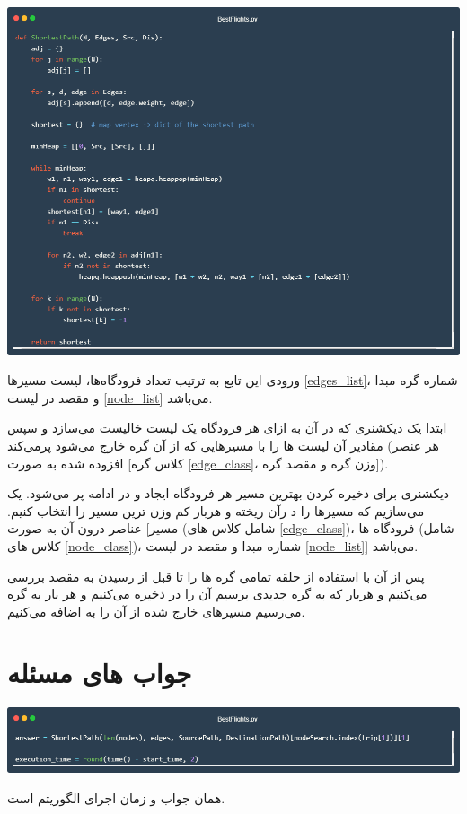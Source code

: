 \documentclass[12pt, dvipsnames, svgnames, x11names,]{article}
\begin{document}
		{\includegraphics[width=14cm]{images/code09}} \par
		{\normalsize 
		ورودی این تابع به ترتیب تعداد فرودگاه‌ها، لیست مسیرها \ref{edges_list}، شماره گره مبدا و مقصد در لیست \ref{node_list} می‌باشد.
		
		ابتدا یک دیکشنری که در آن به ازای هر فرودگاه یک لیست خالیست می‌سازد و سپس مقادیر آن لیست ها را با مسیرهایی که از آن گره خارج می‌شود پرمی‌کند (هر عنصر افزوده شده به صورت  [کلاس گره \ref{edge_class}، وزن گره و مقصد گره]).
		
		دیکشنری  برای ذخیره کردن بهترین مسیر هر فرودگاه ایجاد و در ادامه پر می‌شود.
		یک  می‌سازیم که مسیرها را د رآن ریخته و هربار کم وزن ترین مسیر را انتخاب کنیم. عناصر درون آن به صورت [مسیر (شامل کلاس های \ref{edge_class})، فرودگاه ها (شامل کلاس های \ref{node_class})، شماره مبدا و مقصد در لیست \ref{node_list}] می‌باشد.
		
		پس از آن با استفاده از حلقه  تمامی گره ها را تا قبل از رسیدن به مقصد بررسی می‌کنیم و هربار که به گره جدیدی برسیم آن را در  ذخیره می‌کنیم و هر بار به گره می‌رسیم مسیرهای خارج شده از آن را به  اضافه می‌کنیم.
		}



	\section{جواب های مسئله} \label{answer_ready}

		{\includegraphics[width=14cm]{images/code11}} \par
		{\normalsize 
		 همان جواب و  زمان اجرای الگوریتم است.
		}
\end{document}

